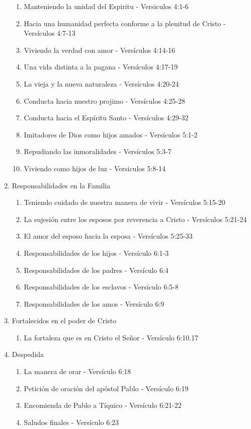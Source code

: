 \documentclass[9pt,letterpaper]{article}
\begin{document}
\begin{enumerate}
		\begin{enumerate}			
			\item Manteniendo la unidad del Espiritu - Versiculos 4:1-6			 
			\item Hacia una humanidad perfecta conforme a la plenitud de Cristo - Versículos 4:7-13
			\item Viviendo la verdad con amor - Versículos 4:14-16
			\item Una vida distinta a la pagana - Versículos 4:17-19
			\item La vieja y la nueva naturaleza - Versículos 4:20-24
			\item Conducta hacia nuestro projimo - Versículos 4:25-28
			\item Conducta hacia el Espíritu Santo - Versículos 4:29-32
			\item Imitadores de Dios como hijos amados - Versículos 5:1-2
			\item Repudiando las inmoralidades - Versículos 5:3-7
			\item Viviendo como hijos de luz - Versiculos 5:8-14
		\end{enumerate}
			\item {\large Responsabilidades en la Familia}
		\begin{enumerate}
			\item Teniendo cuidado de nuestra manera de vivir - Versículos 5:15-20
			\item La sujesión entre los esposos por reverencia a Cristo - Versículos 5:21-24
			\item El amor del esposo hacia la esposa - Versículos 5:25-33
			\item Responsabilidades de los hijos - Versículo 6:1-3
			\item Responsabilidades de los padres - Versículo 6:4
			\item Responsabilidades de los esclavos - Versículo 6:5-8
			\item Responsabilidades de los amos - Versículo 6:9
		\end{enumerate}
		\item {\large Fortalecidos en el poder de Cristo}
		\begin{enumerate}			
			\item  La fortaleza que es en Cristo el Señor - Versículo 6:10.17		
		\end{enumerate}
		\item {\large Despedida}
		\begin{enumerate}
			\item La manera de orar - Versículo 6:18
			\item Petición de oración del apóstol Pablo - Versículo 6:19
			\item Encomienda de Pablo a Tíquico - Versículo 6:21-22
			\item Saludos finales - Versículo 6:23
		\end{enumerate}	
	\end{enumerate}
\end{document}
